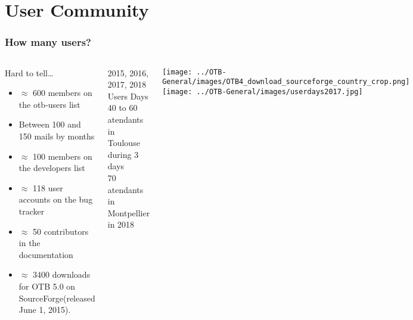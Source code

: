 \section{User Community}

\begin{frame}
  \frametitle{How many users?}
  \begin{columns}[c]
    \begin{block}{Hard to tell\ldots}
      \begin{itemize}
      \item $\approx$ 600 members on the otb-users list
      \item Between 100 and 150 mails by months
      \item $\approx$ 100 members on the developers list
      \item $\approx$ 118 user accounts on the bug tracker
      \item $\approx$ 50 contributors in the documentation
      \item $\approx$ 3400 downloads for OTB 5.0 on SourceForge(released June 1, 2015).
      \end{itemize}
    \end{block}
    \begin{block}{2015, 2016, 2017, 2018 Users Days}
      40 to 60 atendants in Toulouse during 3 days\\
      70 atendants in Montpellier in 2018
    \end{block}
    \texttt{[image: ../OTB-General/images/OTB4\_download\_sourceforge\_country\_crop.png]}\\
    \texttt{[image: ../OTB-General/images/userdays2017.jpg]}
  \end{columns}
\end{frame}

